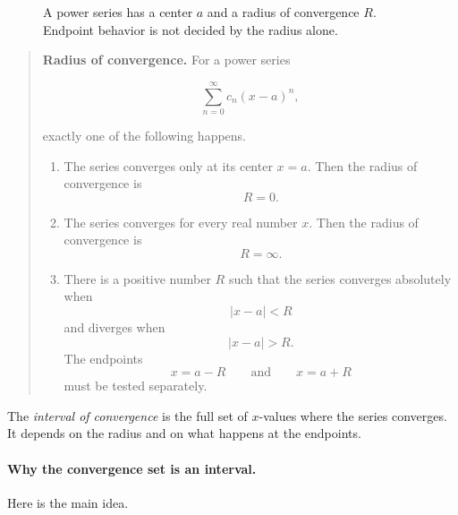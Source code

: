\begin{figure}[h]
\centering
{}
\caption{A power series has a center \(a\) and a radius of convergence \(R\).  Endpoint behavior is not decided by the radius alone.}
\label{fig:radius-of-convergence}
\end{figure}

\begin{quote}
\textbf{Radius of convergence.}
For a power series

\[
\sum_{n=0}^{\infty} c_n(x-a)^n,
\]

exactly one of the following happens.

\begin{enumerate}
\item The series converges only at its center \(x=a\).  Then the radius of convergence is
\[
R=0.
\]

\item The series converges for every real number \(x\).  Then the radius of convergence is
\[
R=\infty.
\]

\item There is a positive number \(R\) such that the series converges absolutely when
\[
|x-a|<R
\]
and diverges when
\[
|x-a|>R.
\]
The endpoints
\[
x=a-R
\qquad\text{and}\qquad
x=a+R
\]
must be tested separately.
\end{enumerate}
\end{quote}

The \emph{interval of convergence} is the full set of \(x\)-values where the series
converges.  It depends on the radius and on what happens at the endpoints.

\paragraph{Why the convergence set is an interval.}
Here is the main idea.

